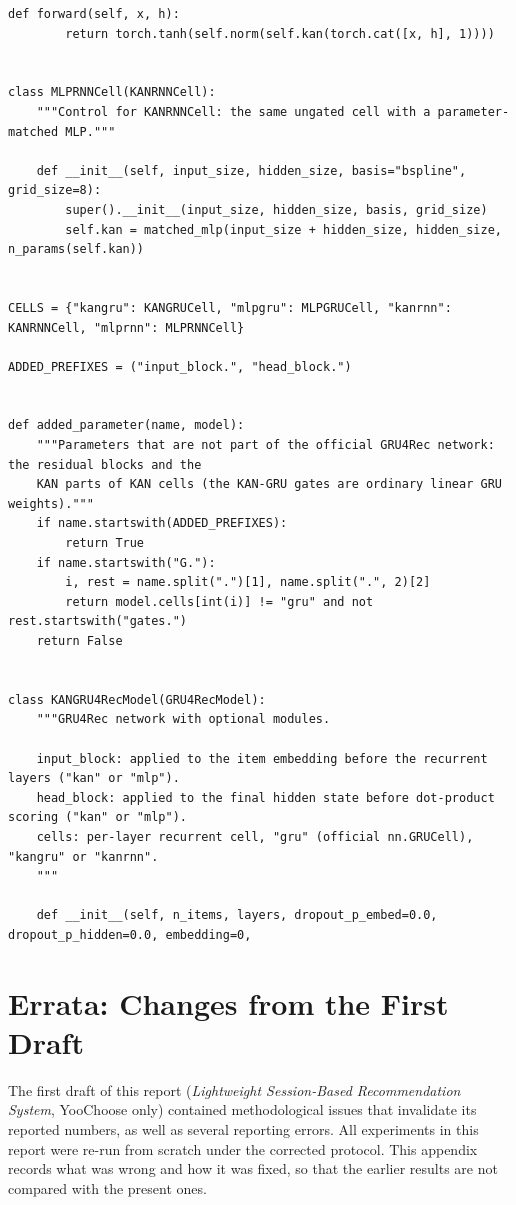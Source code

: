 \documentclass[12pt,a4paper]{report}
\begin{document}
\begin{lstlisting}[style=pythonstyle, caption={KAN-GRU cell, draft cell and the extended GRU4Rec network (\texttt{kanrec/session.py}, first part).}]
    def forward(self, x, h):
        return torch.tanh(self.norm(self.kan(torch.cat([x, h], 1))))


class MLPRNNCell(KANRNNCell):
    """Control for KANRNNCell: the same ungated cell with a parameter-matched MLP."""

    def __init__(self, input_size, hidden_size, basis="bspline", grid_size=8):
        super().__init__(input_size, hidden_size, basis, grid_size)
        self.kan = matched_mlp(input_size + hidden_size, hidden_size, n_params(self.kan))


CELLS = {"kangru": KANGRUCell, "mlpgru": MLPGRUCell, "kanrnn": KANRNNCell, "mlprnn": MLPRNNCell}

ADDED_PREFIXES = ("input_block.", "head_block.")


def added_parameter(name, model):
    """Parameters that are not part of the official GRU4Rec network: the residual blocks and the
    KAN parts of KAN cells (the KAN-GRU gates are ordinary linear GRU weights)."""
    if name.startswith(ADDED_PREFIXES):
        return True
    if name.startswith("G."):
        i, rest = name.split(".")[1], name.split(".", 2)[2]
        return model.cells[int(i)] != "gru" and not rest.startswith("gates.")
    return False


class KANGRU4RecModel(GRU4RecModel):
    """GRU4Rec network with optional modules.

    input_block: applied to the item embedding before the recurrent layers ("kan" or "mlp").
    head_block: applied to the final hidden state before dot-product scoring ("kan" or "mlp").
    cells: per-layer recurrent cell, "gru" (official nn.GRUCell), "kangru" or "kanrnn".
    """

    def __init__(self, n_items, layers, dropout_p_embed=0.0, dropout_p_hidden=0.0, embedding=0,
\end{lstlisting}


\chapter{Errata: Changes from the First Draft}
\label{app:errata}

The first draft of this report (\emph{Lightweight Session-Based Recommendation
System}, YooChoose only) contained methodological issues that invalidate its
reported numbers, as well as several reporting errors. All experiments in this
report were re-run from scratch under the corrected protocol. This appendix
records what was wrong and how it was fixed, so that the earlier results are not
compared with the present ones.
\end{document}
